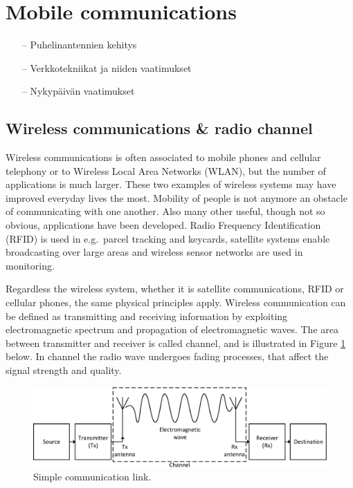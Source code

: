 \section{Mobile communications}
\label{sec:mobile_com}

\begin{itemize}
\item[--]Puhelinantennien kehitys
\item[--]Verkkotekniikat ja niiden vaatimukset
\item[--]Nykypäivän vaatimukset
\end{itemize}

\subsection{Wireless communications \& radio channel}
\label{sec:wireless_channel}
Wireless communications is often associated to mobile phones and cellular telephony or to Wireless Local Area Networks (WLAN), but the number of applications is much larger. These two examples of wireless systems may have improved everyday lives the most. Mobility of people is not anymore an obstacle of communicating with one another. Also many other useful, though not so obvious, applications have been developed. Radio Frequency Identification (RFID) is used in e.g.\ parcel tracking and keycards, satellite systems enable broadcasting over large areas and wireless sensor networks are used in monitoring. \cite{molisch}

Regardless the wireless system, whether it is satellite communications, RFID or cellular phones, the same physical principles apply. Wireless communication can be defined as transmitting and receiving information by exploiting electromagnetic spectrum and propagation of electromagnetic waves. The area between transmitter and receiver is called channel, and is illustrated in Figure \ref{fig:com_link} below. In channel the radio wave undergoes fading processes, that affect the signal strength and quality. \cite{saunders}

\begin{figure}[H]
    \centering
    \includegraphics[width=\textwidth]{img/com_link.eps}
    \caption{Simple communication link.}
    \label{fig:com_link}
\end{figure}

